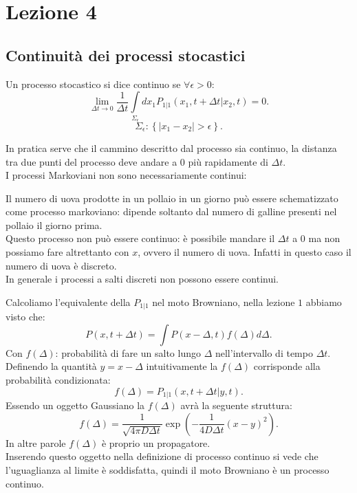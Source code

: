 \section{Lezione 4}%
\label{sub:Lezione 4}
\subsection{Continuità dei processi stocastici}%
\label{sub:Continuità dei processi stocastici}
\begin{defn}
    Un processo stocastico si dice continuo se $\forall \epsilon > 0$: 
    \[
	\lim_{\Delta t \to 0} \frac{1}{\Delta t}\int\limits_{\Sigma_\epsilon}   dx_1 P_{1|1}(x_1, t + \Delta t | x_2, t) = 0
    .\] 
    \[
        \Sigma_\epsilon : \left\{ \left|x_1-x_2\right|>\epsilon\right\}
    .\] 
\end{defn}
\noindent
In pratica serve che il cammino descritto dal processo sia continuo, la distanza tra due punti del processo deve andare a $0$ più rapidamente di $\Delta t$.\\
I processi Markoviani non sono necessariamente continui:
\begin{exmp}[Pollaio]
    Il numero di uova prodotte in un pollaio in un giorno può essere schematizzato come processo markoviano: dipende soltanto dal numero di galline presenti nel pollaio il giorno prima.\\
    Questo processo non può essere continuo: è possibile mandare il $\Delta t$ a $0$ ma non possiamo fare altrettanto con $x$, ovvero il numero di uova. Infatti in questo caso il numero di uova è discreto. \\
    In generale i processi a salti discreti non possono essere continui.
\end{exmp}
\noindent
\begin{exmp}
    Calcoliamo l'equivalente della $P_{1|1}$ nel moto Browniano, nella lezione $1$ abbiamo visto che:
    \[
	P(x, t+\Delta t) = \int P(x-\Delta, t) f(\Delta) d\Delta
    .\] 
    Con $f(\Delta)$: probabilità di fare un salto lungo $\Delta$ nell'intervallo di tempo $\Delta t$.\\
    Definendo la quantità $y = x-\Delta$ intuitivamente la $f(\Delta)$ corrisponde alla probabilità condizionata:
    \[
	f(\Delta) = P_{1|1}(x, t+\Delta t| y, t) 
    .\] 
    Essendo un oggetto Gaussiano la $f(\Delta)$ avrà la seguente struttura:
    \[
	f(\Delta) = \frac{1}{\sqrt{4\pi D\Delta t} }\exp\left(-\frac{1}{4D\Delta t} \left(x-y\right)^2  \right) 
    .\] 
    In altre parole $f(\Delta)$ è proprio un propagatore.\\
    Inserendo questo oggetto nella definizione di processo continuo si vede che l'uguaglianza al limite è soddisfatta, quindi il moto Browniano è un processo continuo.
\end{exmp}
